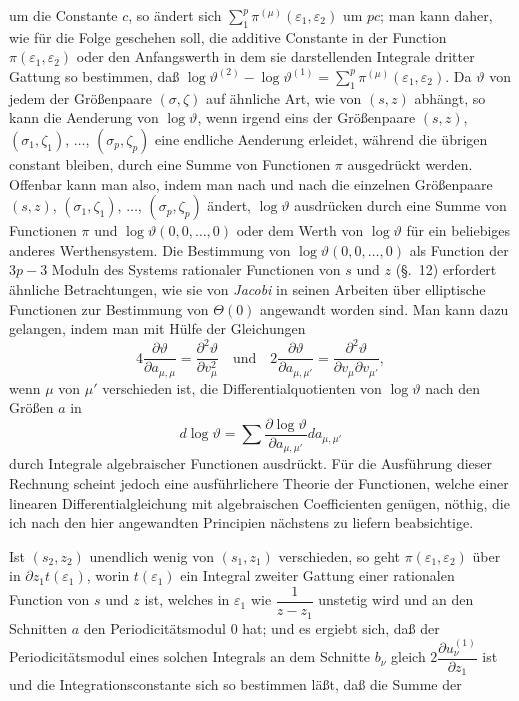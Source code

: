 \documentclass{article}
\begin{document}
um die Constante $c$, so ändert sich $\displaystyle\sum_{1}^{p} \pi^{(\mu)}(\varepsilon_{1}, \varepsilon_{2})$ um $pc$; man kann daher, wie für die Folge geschehen soll, die additive Constante in der Function $\pi(\varepsilon_{1}, \varepsilon_{2})$ oder den Anfangswerth in dem sie darstellenden Integrale dritter Gattung so bestimmen, daß $\log\vartheta^{(2)} - \log\vartheta^{(1)} = \displaystyle\sum_{1}^{p} \pi^{(\mu)}(\varepsilon_{1}, \varepsilon_{2})$. Da $\vartheta$ von jedem der Größenpaare $(\sigma, \zeta)$ auf ähnliche Art, wie von $(s, z)$ abhängt, so kann die Aenderung von $\log\vartheta$, wenn irgend eins der Größenpaare $(s, z)$, $(\sigma_{1}, \zeta_{1})$, $\ldots$, $(\sigma_{p}, \zeta_{p})$ eine endliche Aenderung erleidet, während die übrigen constant bleiben, durch eine Summe von Functionen $\pi$ ausgedrückt werden. Offenbar kann man also, indem man nach und nach die einzelnen Größenpaare $(s, z)$, $(\sigma_{1}, \zeta_{1})$, $\ldots$, $(\sigma_{p}, \zeta_{p})$ ändert, $\log\vartheta$ ausdrücken durch eine Summe von Functionen $\pi$ und $\log\vartheta(0, 0, \ldots, 0)$ oder dem Werth von $\log\vartheta$ für ein beliebiges anderes Werthensystem. Die Bestimmung von $\log\vartheta(0, 0, \ldots, 0)$ als Function der $3p-3$ Moduln des Systems rationaler Functionen von $s$ und $z$ (§.~12) erfordert ähnliche Betrachtungen, wie sie von \emph{Jacobi} in seinen Arbeiten über elliptische Functionen zur Bestimmung von $\Theta(0)$ angewandt worden sind. Man kann dazu gelangen, indem man mit Hülfe der Gleichungen
\[ 4\frac{\partial\vartheta}{\partial a_{\mu,\mu}} = \frac{\partial^{2}\vartheta}{\partial v_{\mu}^{2}} \quad \text{und} \quad 2\frac{\partial\vartheta}{\partial a_{\mu,\mu'}} = \frac{\partial^{2}\vartheta}{\partial v_{\mu} \partial v_{\mu'}}, \]
wenn $\mu$ von $\mu'$ verschieden ist, die Differentialquotienten von $\log\vartheta$ nach den Größen $a$ in
\[ d\log\vartheta = \sum \frac{\partial \log\vartheta}{\partial a_{\mu,\mu'}} da_{\mu,\mu'} \]
durch Integrale algebraischer Functionen ausdrückt. Für die Ausführung dieser Rechnung scheint jedoch eine ausführlichere Theorie der Functionen, welche einer linearen Differentialgleichung mit algebraischen Coefficienten genügen, nöthig, die ich nach den hier angewandten Principien nächstens zu liefern beabsichtige.

Ist $(s_{2}, z_{2})$ unendlich wenig von $(s_{1}, z_{1})$ verschieden, so geht $\pi(\varepsilon_{1}, \varepsilon_{2})$ über in $\partial z_{1} t(\varepsilon_{1})$, worin $t(\varepsilon_{1})$ ein Integral zweiter Gattung einer rationalen Function von $s$ und $z$ ist, welches in $\varepsilon_{1}$ wie $\dfrac{1}{z-z_{1}}$ unstetig wird und an den Schnitten $a$ den Periodicitätsmodul 0 hat; und es ergiebt sich, daß der Periodicitätsmodul eines solchen Integrals an dem Schnitte $b_{\nu}$ gleich $2\dfrac{\partial u_{\nu}^{(1)}}{\partial z_{1}}$ ist und die Integrationsconstante sich so bestimmen läßt, daß die Summe der
\end{document}
